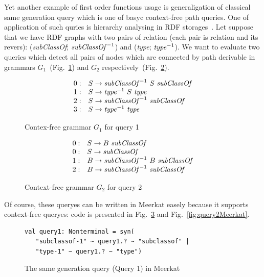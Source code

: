 Yet another example of first order functions usage is generaligation of classical same generation query which is one of basyc context-free path queries.
One of application of such quries is hierarchy analysing in RDF storages~\cite{RDF}.
Let suppose that we have RDF graphs with two pairs of relation (each pair is relation and its revers): (\emph{subClassOf}; $\text{\emph{subClassOf}}^{-1}$) and (\emph{type}; $\text{\emph{type}}^{-1}$).
We want to evaluate two queries which detect all pairs of nodes which are connected by path derivable in grammars $G_1$~(Fig.~\ref{grammarQ1}) and $G_2$ respectively~(Fig.~\ref{grammarQ2}). 


\begin{figure}[ht]
   \centering
   \[
\begin{array}{rl}
   0: & S \rightarrow \text{\textit{subClassOf}}^{-1} \ S \ \text{\textit{subClassOf}} \\ 
   1: & S \rightarrow \text{\textit{type}}^{-1} \ S \ \text{\textit{type}} \\ 
   2: & S \rightarrow \text{\textit{subClassOf}}^{-1} \ \text{\textit{subClassOf}} \\ 
   3: & S \rightarrow \text{\textit{type}}^{-1} \ \text{\textit{type}} \\ 
\end{array}
\]
   \caption{Contex-free grammar $G_1$ for query 1}
   \label{grammarQ1}
   \end{figure}

\begin{figure}[h]
   \centering
   \[
\begin{array}{rl}
   0: & S \rightarrow B \ \text{\textit{subClassOf}} \\ 
   0: & S \rightarrow \text{\textit{subClassOf}} \\ 
   1: & B \rightarrow \text{\textit{subClassOf}}^{-1} \ B \ \text{\textit{subClassOf}} \\
   2: & B \rightarrow \text{\textit{subClassOf}}^{-1} \ \text{\textit{subClassOf}} \\ 
\end{array}
\]
   \caption{Context-free grammar $G_2$ for query 2}
   \label{grammarQ2}        
   \end{figure}

   Of course, these queryes can be written in Meerkat easely because it supports context-free queryes: code is presented in Fig.~\ref{fig:query1Meerkat} and Fig.~\ref{fig:query2Meerkat}.

\begin{figure}[h]
\begin{lstlisting}
val query1: Nonterminal = syn(
   "subclassof-1" ~ query1.? ~ "subclassof" |
   "type-1" ~ query1.? ~ "type")
\end{lstlisting}
\caption{The same generation query (Query 1) in Meerkat}
\label{fig:query1Meerkat}
\end{figure}


